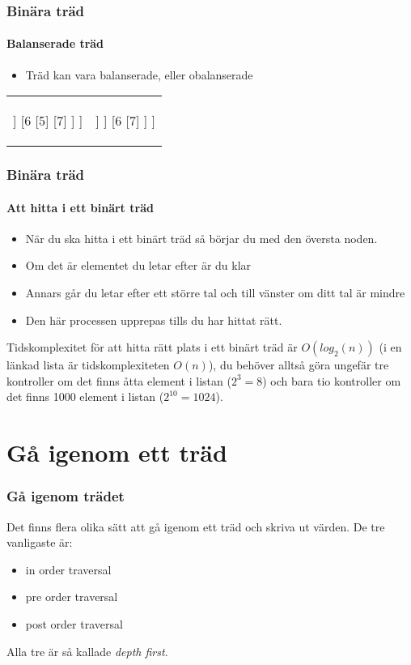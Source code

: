 \documentclass[aspectratio=169]{beamer}
\begin{document}
\begin{frame}
	\frametitle{Binära träd}
	\framesubtitle{Balanserade träd}
	
	\begin{itemize}
		\item Träd kan vara balanserade, eller obalanserade
	\end{itemize}
	
	\begin{center}
		\begin{tabular}{cc}
		\begin{forest}
			[4
				[2
					[1]
					[3]
				]
				[6
					[5]
					[7]
				]
			]
		\end{forest}
		&
		\begin{forest}
			[5
				[2
					[1]
					[3
						[4]
					]
				]
				[6
					[7]
				]
			]
		\end{forest}
		\end{tabular}
	\end{center}
	
\end{frame}

\begin{frame}
	\frametitle{Binära träd}
	\framesubtitle{Att hitta i ett binärt träd}
	
	\begin{itemize}
		\item När du ska hitta i ett binärt träd så börjar du med den översta noden.
		\item Om det är elementet du letar efter är du klar
		\item Annars går du letar efter ett större tal och till vänster om ditt tal är mindre
		\item Den här processen upprepas tills du har hittat rätt.
	\end{itemize}
	
	Tidskomplexitet för att hitta rätt plats i ett binärt träd är \(O(log_2{(n)})\) (i en länkad lista är tidskomplexiteten \(O(n)\)), du behöver alltså göra ungefär tre kontroller om det finns åtta element i listan (\(2^3=8\)) och bara tio kontroller om det finns 1000 element i listan (\(2^{10}=1024\)).
	
\end{frame}

\section{Gå igenom ett träd}

\begin{frame}
	\frametitle{Gå igenom trädet}
	
	Det finns flera olika sätt att gå igenom ett träd och skriva ut värden. De tre vanligaste är:
	
	\begin{itemize}
		\item in order traversal
		\item pre order traversal
		\item post order traversal
	\end{itemize}
	
	Alla tre är så kallade \textit{depth first}.
	
\end{frame}
\end{document}

